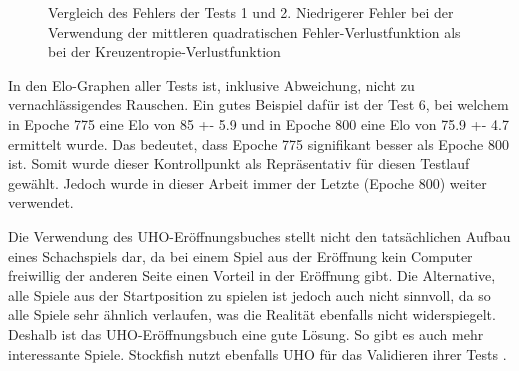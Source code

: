 \begin{figure}
  \centering
  \caption{Vergleich des Fehlers der Tests 1 und 2. Niedrigerer Fehler bei der Verwendung der mittleren quadratischen Fehler-Verlustfunktion als bei der Kreuzentropie-Verlustfunktion}
  \label{fig:loss1_2}
\end{figure}

In den Elo-Graphen aller Tests ist, inklusive Abweichung, nicht zu vernachlässigendes Rauschen. Ein gutes Beispiel dafür ist der Test 6, bei welchem in Epoche 775 eine Elo von 85 +- 5.9 und in Epoche 800 eine Elo von 75.9 +- 4.7 ermittelt wurde. Das bedeutet, dass Epoche 775 signifikant besser als Epoche 800 ist. Somit wurde dieser Kontrollpunkt als Repräsentativ für diesen Testlauf gewählt. Jedoch wurde in dieser Arbeit immer der Letzte (Epoche 800) weiter verwendet.



Die Verwendung des \ac{UHO}-Eröffnungsbuches stellt nicht den tatsächlichen Aufbau eines Schachspiels dar, da bei einem Spiel aus der Eröffnung kein Computer freiwillig der anderen Seite einen Vorteil in der Eröffnung gibt. Die Alternative, alle Spiele aus der Startposition zu spielen ist jedoch auch nicht sinnvoll, da so alle Spiele sehr ähnlich verlaufen, was die Realität ebenfalls nicht widerspiegelt. Deshalb ist das \ac{UHO}-Eröffnungsbuch eine gute Lösung. So gibt es auch mehr interessante Spiele. Stockfish nutzt ebenfalls \ac{UHO} für das Validieren ihrer Tests \cite{Fishtest}. 

